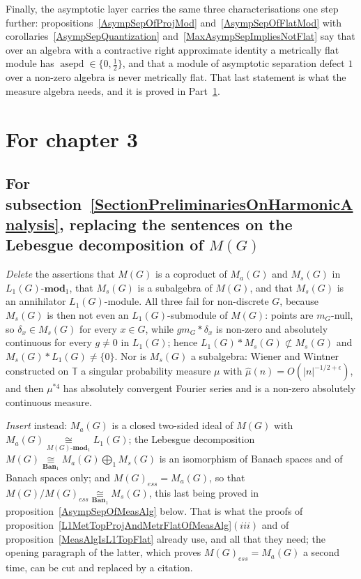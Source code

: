 \documentclass[11pt]{article}
\theoremstyle{plain}
\theoremstyle{definition}
\newcommand{\convol}{\ast}
\newcommand{\isom}[1]{\mathrel{\mathop{\cong}\limits_{#1}}}
\DeclareMathOperator{\asepd}{asepd}
\begin{document}
Finally, the asymptotic layer carries the same three characterisations one step
further: propositions~\ref{AsympSepOfProjMod} and~\ref{AsympSepOfFlatMod} with
corollaries~\ref{AsympSepQuantization} and~\ref{MaxAsympSepImpliesNotFlat} say
that over an algebra with a contractive right approximate identity a metrically
flat module has $\asepd\in \{0,\tfrac{1}{2} \}$, and that a module of asymptotic
separation defect $1$ over a non-zero algebra is never metrically flat. That last
statement is what the measure algebra needs, and it is proved in
Part~\ref{PartIII}.

\section{For chapter 3}\label{PartIII}

\subsection{For subsection~\ref{SectionPreliminariesOnHarmonicAnalysis}, replacing
the sentences on the Lebesgue decomposition of $M(G)$}

\emph{Delete} the assertions that $M(G)$ is a coproduct of $M_a(G)$ and $M_s(G)$
in $L_1(G)\text{-}\mathbf{mod}_1$, that $M_s(G)$ is a subalgebra of $M(G)$, and
that $M_s(G)$ is an annihilator $L_1(G)$-module. All three fail for non-discrete
$G$, because $M_s(G)$ is then not even an $L_1(G)$-submodule of $M(G)$: points
are $m_G$-null, so $\delta_x\in M_s(G)$ for every $x\in G$, while
$gm_G\convol\delta_x$ is non-zero and absolutely continuous for every $g\neq 0$
in $L_1(G)$; hence $L_1(G)\convol M_s(G)\not\subset M_s(G)$ and
$M_s(G)\convol L_1(G)\neq \{0 \}$. Nor is $M_s(G)$ a subalgebra: Wiener and
Wintner constructed on $\mathbb{T}$ a singular probability measure $\mu$ with
$\widehat\mu(n)=O(|n|^{-1/2+\epsilon})$, and then $\mu^{\convol 4}$ has
absolutely convergent Fourier series and is a non-zero absolutely continuous
measure.

\emph{Insert} instead: $M_a(G)$ is a closed two-sided ideal of $M(G)$ with
$M_a(G)\isom{M(G)\text{-}\mathbf{mod}_1}L_1(G)$; the Lebesgue decomposition
$M(G)\isom{\mathbf{Ban}_1}M_a(G)\bigoplus_1 M_s(G)$ is an isomorphism of Banach
spaces and of Banach spaces only; and ${M(G)}_{ess}=M_a(G)$, so that
$M(G)/{M(G)}_{ess}\isom{\mathbf{Ban}_1}M_s(G)$, this last being proved in
proposition~\ref{AsympSepOfMeasAlg} below. That is what the proofs of
proposition~\ref{L1MetTopProjAndMetrFlatOfMeasAlg}$(iii)$ and of
proposition~\ref{MeasAlgIsL1TopFlat} already use, and all that they need; the
opening paragraph of the latter, which proves ${M(G)}_{ess}=M_a(G)$ a second
time, can be cut and replaced by a citation.
\end{document}
